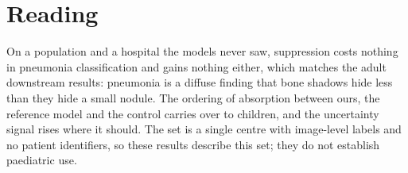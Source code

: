\section{Reading}
On a population and a hospital the models never saw, suppression costs nothing in pneumonia classification and gains nothing either, which
matches the adult downstream results: pneumonia is a diffuse finding that bone shadows hide less than they hide a small nodule. The ordering
of absorption between ours, the reference model and the control carries over to children, and the uncertainty signal rises where it should.
The set is a single centre with image-level labels and no patient identifiers, so these results describe this set; they do not establish
paediatric use.
